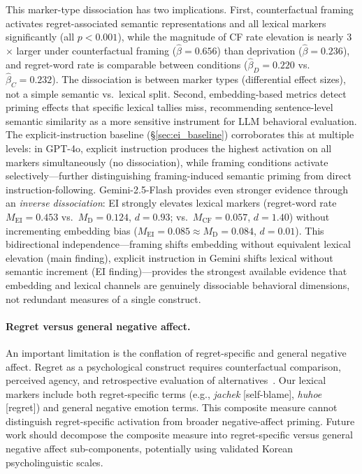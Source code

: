 \documentclass[11pt]{article}
\begin{document}
This marker-type dissociation has two implications. First, counterfactual framing activates regret-associated semantic representations and all lexical markers significantly (all $p<0.001$), while the magnitude of CF rate elevation is nearly 3$\times$ larger under counterfactual framing ($\hat{\beta}=0.656$) than deprivation ($\hat{\beta}=0.236$), and regret-word rate is comparable between conditions ($\hat{\beta}_D=0.220$ vs.\ $\hat{\beta}_C=0.232$). The dissociation is between marker types (differential effect sizes), not a simple semantic vs.\ lexical split. Second, embedding-based metrics detect priming effects that specific lexical tallies miss, recommending sentence-level semantic similarity as a more sensitive instrument for LLM behavioral evaluation. The explicit-instruction baseline (\S\ref{sec:ei_baseline}) corroborates this at multiple levels: in GPT-4o, explicit instruction produces the highest activation on all markers simultaneously (no dissociation), while framing conditions activate selectively---further distinguishing framing-induced semantic priming from direct instruction-following. Gemini-2.5-Flash provides even stronger evidence through an \emph{inverse dissociation}: EI strongly elevates lexical markers (regret-word rate $M_\text{EI}=0.453$ vs.\ $M_\text{D}=0.124$, $d=0.93$; vs.\ $M_\text{CF}=0.057$, $d=1.40$) without incrementing embedding bias ($M_\text{EI}=0.085 \approx M_\text{D}=0.084$, $d=0.01$). This bidirectional independence---framing shifts embedding without equivalent lexical elevation (main finding), explicit instruction in Gemini shifts lexical without semantic increment (EI finding)---provides the strongest available evidence that embedding and lexical channels are genuinely dissociable behavioral dimensions, not redundant measures of a single construct.

\paragraph{Regret versus general negative affect.}
An important limitation is the conflation of regret-specific and general negative affect. Regret as a psychological construct requires counterfactual comparison, perceived agency, and retrospective evaluation of alternatives~\citep{roese2017, zeelenberg1998}. Our lexical markers include both regret-specific terms (e.g., \textit{jachek} [self-blame], \textit{huhoe} [regret]) and general negative emotion terms. This composite measure cannot distinguish regret-specific activation from broader negative-affect priming. Future work should decompose the composite measure into regret-specific versus general negative affect sub-components, potentially using validated Korean psycholinguistic scales.
\end{document}
